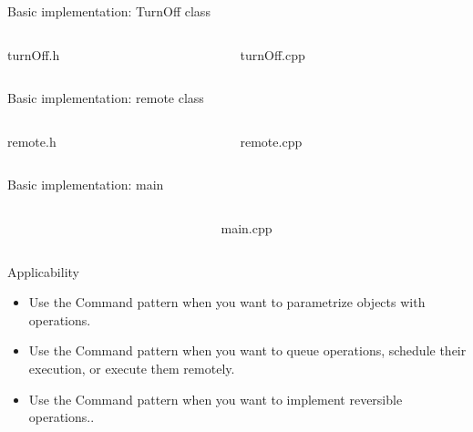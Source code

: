 \documentclass[13pt]{beamer}
\begin{document}
\begin{frame}{Basic implementation: TurnOff class}
\begin{columns}[T]
\begin{column}{.45\textwidth}
\lstset{basicstyle=\tiny,style=myCustomCppStyle}
turnOff.h

\end{column}

\begin{column}{.45\textwidth}
\lstset{basicstyle=\tiny,style=myCustomCppStyle}
turnOff.cpp

\end{column}
\end{columns}
\end{frame}

\begin{frame}{Basic implementation: remote class}
\begin{columns}[T]
\begin{column}{.45\textwidth}
\lstset{basicstyle=\tiny,style=myCustomCppStyle}
remote.h

\end{column}

\begin{column}{.45\textwidth}
\lstset{basicstyle=\tiny,style=myCustomCppStyle}
remote.cpp

\end{column}
\end{columns}
\end{frame}

\begin{frame}{Basic implementation: main}
\begin{columns}[T]
\begin{column}{.45\textwidth}

\end{column}

\begin{column}{.45\textwidth}
\lstset{basicstyle=\tiny,style=myCustomCppStyle}
main.cpp

\end{column}
\end{columns}
\end{frame}

\begin{frame}{Applicability}
	\begin{itemize}
		\item Use the Command pattern when you want to parametrize objects with operations.
		\item Use the Command pattern when you want to queue operations, schedule their execution, or execute them remotely.
		\item Use the Command pattern when you want to implement reversible operations..
	\end{itemize}
\end{frame}
\end{document}
